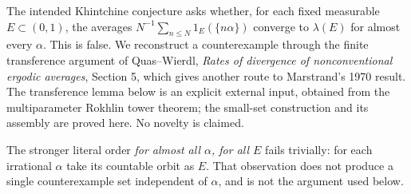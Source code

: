 The intended Khintchine conjecture asks whether, for each fixed measurable $E\subset(0,1)$, the averages
$N^{-1}\sum_{n\le N}1_E(\{n\alpha\})$ converge to $\lambda(E)$ for almost every $\alpha$.
This is false. We reconstruct a counterexample through the finite transference argument of Quas--Wierdl, \emph{Rates of divergence of nonconventional ergodic averages}, Section 5, which gives another route to Marstrand's 1970 result.
The transference lemma below is an explicit external input, obtained from the multiparameter Rokhlin tower theorem; the small-set construction and its assembly are proved here. No novelty is claimed.

The stronger literal order \emph{for almost all $\alpha$, for all $E$} fails trivially: for each irrational $\alpha$ take its countable orbit as $E$. That observation does not produce a single counterexample set independent of $\alpha$, and is not the argument used below.
